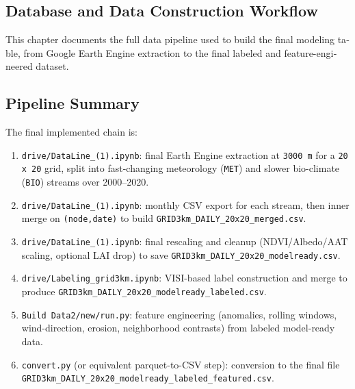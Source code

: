 \documentclass[12pt,a4paper]{article}
\begin{document}
\begin{latin}
\section{Database and Data Construction Workflow}
This chapter documents the full data pipeline used to build the final modeling table, from Google Earth Engine extraction to the final labeled and feature-engineered dataset.

\subsection{Pipeline Summary}
The final implemented chain is:
\begin{enumerate}
\item \texttt{drive/DataLine\_(1).ipynb}: final Earth Engine extraction at \texttt{3000 m} for a \texttt{20 x 20} grid, split into fast-changing meteorology (\texttt{MET}) and slower bio-climate (\texttt{BIO}) streams over 2000--2020.
\item \texttt{drive/DataLine\_(1).ipynb}: monthly CSV export for each stream, then inner merge on \texttt{(node,date)} to build \texttt{GRID3km\_DAILY\_20x20\_merged.csv}.
\item \texttt{drive/DataLine\_(1).ipynb}: final rescaling and cleanup (NDVI/Albedo/AAT scaling, optional LAI drop) to save \texttt{GRID3km\_DAILY\_20x20\_modelready.csv}.
\item \texttt{drive/Labeling\_grid3km.ipynb}: VISI-based label construction and merge to produce \texttt{GRID3km\_DAILY\_20x20\_modelready\_labeled.csv}.
\item \texttt{Build Data2/new/run.py}: feature engineering (anomalies, rolling windows, wind-direction, erosion, neighborhood contrasts) from labeled model-ready data.
\item \texttt{convert.py} (or equivalent parquet-to-CSV step): conversion to the final file \texttt{GRID3km\_DAILY\_20x20\_modelready\_labeled\_featured.csv}.
\end{enumerate}


\end{latin}
\end{document}
